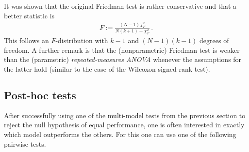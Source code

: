     \begin{remark}
        It was shown that the original Friedman test is rather conservative and that a better statistic is
        \begin{gather}
            F := \frac{(N-1)\chi^2_F}{N(k+1)-\chi^2_F}\,.
        \end{gather}
        This follows an $F$-distribution with $k-1$ and $(N-1)(k-1)$ degrees of freedom. A further remark is that the (nonparametric) Friedman test is weaker than the (parametric) \textit{repeated-measures ANOVA} whenever the assumptions for the latter hold (similar to the case of the Wilcoxon signed-rank test).
    \end{remark}

\subsection{Post-hoc tests}

    After successfully using one of the multi-model tests from the previous section to reject the null hypothesis of equal performance, one is often interested in exactly which model outperforms the others. For this one can use one of the following pairwise tests.

